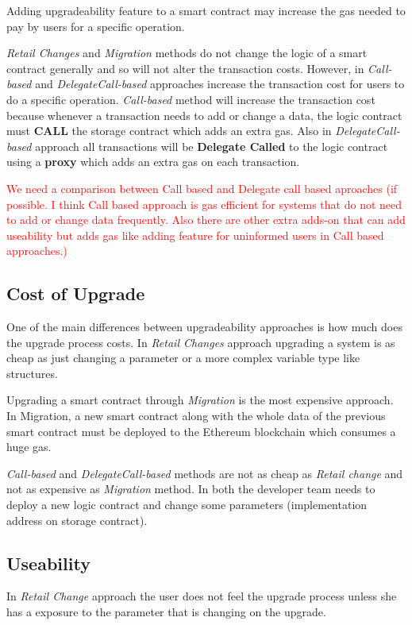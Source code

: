  Adding upgradeability feature to a smart contract may increase the gas needed to pay by users for a specific operation. 

\textit{Retail Changes} and \textit{Migration} methods do not change the logic of a smart contract generally and so will not alter the transaction costs. However, in \textit{Call-based} and \textit{DelegateCall-based} approaches increase the transaction cost for users to do a specific operation. \textit{Call-based} method will increase the transaction cost because whenever a transaction needs to add or change a data, the logic contract must \textbf{CALL} the storage contract which adds an extra gas. Also in \textit{DelegateCall-based} approach all transactions will be \textbf{Delegate Called} to the logic contract using a \textbf{proxy} which adds an extra gas on each transaction. 

\textcolor{red}{We need a comparison between Call based and Delegate call based aproaches (if possible. I think Call based approach is gas efficient for systems that do not need to add or change data frequently. Also there are other extra adds-on that can add useability but adds gas like adding feature for uninformed users in Call based approaches.)}


 \subsection{Cost of Upgrade}

 One of the main differences between upgradeability approaches is how much does the upgrade process costs. In \textit{Retail Changes} approach upgrading a system is as cheap as just changing a parameter or a more complex variable type like structures.

Upgrading a smart contract through \textit{Migration} is the most expensive approach. In Migration, a new smart contract along with the whole data of the previous smart contract must be deployed to the Ethereum blockchain which consumes a huge gas.  

\textit{Call-based} and \textit{DelegateCall-based} methods are not as cheap as \textit{Retail change} and not as expensive as \textit{Migration} method. In both the developer team needs to deploy a new logic contract and change some parameters (\eg implementation address on storage contract).

 \subsection{Useability}
 In \textit{Retail Change} approach the user does not feel the upgrade process unless she has a exposure to the parameter that is changing on the upgrade.


